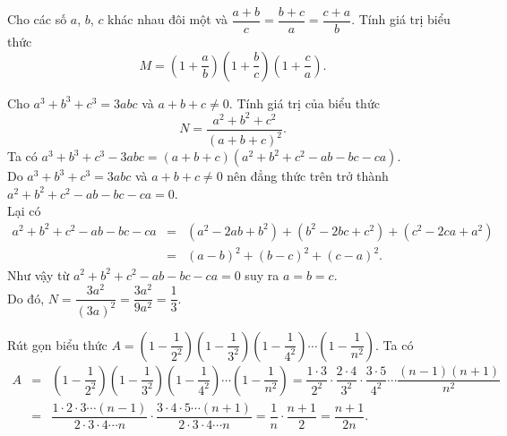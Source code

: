 \begin{bt}%
	Cho các số $a$, $b$, $c$ khác nhau đôi một và $\dfrac{a+b}{c}=\dfrac{b+c}{a}=\dfrac{c+a}{b}$. Tính giá trị biểu thức
	$$M = \left( 1+\dfrac{a}{b}\right)\left( 1+\dfrac{b}{c}\right)\left( 1+\dfrac{c}{a}\right).$$
\end{bt}

\begin{bt}%
 Cho $a^3+b^3+c^3=3abc$ và $a+b+c \neq 0$. Tính giá trị của biểu thức $$N=\dfrac{a^2+b^2+c^2}{(a+b+c)^2}.$$
 \loigiai
  {
  Ta có $a^3+b^3+c^3-3abc=(a+b+c)(a^2+b^2+c^2-ab-bc-ca)$.\\
  Do $a^3+b^3+c^3=3abc$ và $a+b+c \neq 0$ nên đẳng thức trên trở thành $a^2+b^2+c^2-ab-bc-ca=0$.\\
  Lại có
  \begin{eqnarray*}
   a^2+b^2+c^2-ab-bc-ca &=& (a^2-2ab+b^2)+(b^2-2bc+c^2)+(c^2-2ca+a^2)\\
   &=& (a-b)^2+(b-c)^2+(c-a)^2.
  \end{eqnarray*}
  Như vậy từ $a^2+b^2+c^2-ab-bc-ca=0$ suy ra $a=b=c$.\\
  Do đó, $N=\dfrac{3a^2}{(3a)^2} = \dfrac{3a^2}{9a^2} = \dfrac{1}{3}$.
  }
\end{bt}

\begin{bt}%
 Rút gọn biểu thức $A=\left(1-\dfrac{1}{2^2}\right) \left(1-\dfrac{1}{3^2}\right) \left(1-\dfrac{1}{4^2}\right) \cdots \left(1-\dfrac{1}{n^2}\right)$.
 \loigiai
  {
  Ta có
  \allowdisplaybreaks
  \begin{eqnarray*}
   A &=& \left(1-\dfrac{1}{2^2}\right) \left(1-\dfrac{1}{3^2}\right) \left(1-\dfrac{1}{4^2}\right) \cdots \left(1-\dfrac{1}{n^2}\right)
   = \dfrac{1 \cdot 3}{2^2} \cdot \dfrac{2 \cdot 4}{3^2} \cdot \dfrac{3 \cdot 5}{4^2} \cdots \dfrac{(n-1)(n+1)}{n^2}\\
   &=& \dfrac{1 \cdot 2 \cdot 3 \cdots (n-1)}{2 \cdot 3 \cdot 4 \cdots n} \cdot \dfrac{3 \cdot 4 \cdot 5 \cdots (n+1)}{2 \cdot 3 \cdot 4 \cdots n} = \dfrac{1}{n} \cdot \dfrac{n+1}{2} = \dfrac{n+1}{2n}.
  \end{eqnarray*}
  }
\end{bt}

